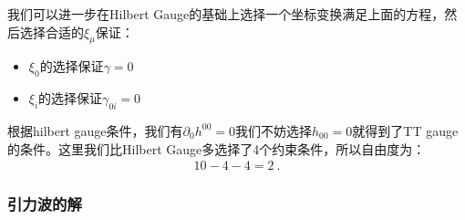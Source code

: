 我们可以进一步在Hilbert Gauge的基础上选择一个坐标变换满足上面的方程，然后选择合适的$ \xi_\mu $保证：
\begin{itemize}
  \item $ \xi_0 $的选择保证$ \gamma = 0 $
  \item $ \xi_i $的选择保证$ \gamma_{0i} = 0 $
\end{itemize}
根据hilbert gauge条件，我们有$ \partial_{0}h^{00} = 0 $我们不妨选择$ h_{00} = 0
$就得到了TT gauge的条件。这里我们比Hilbert Gauge多选择了4个约束条件，所以自由度为：
\begin{align}
  10 - 4 - 4 = 2\mathrm{~.}
\end{align}

\subsubsection{引力波的解}

\bigskip
{}

